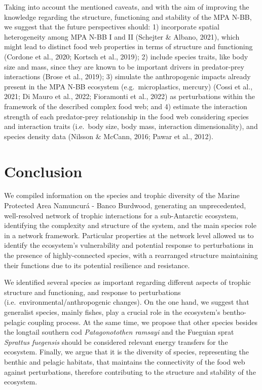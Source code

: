 \documentclass[preprint, 3p,
authoryear]{elsarticle} %
\begin{document}
Taking into account the mentioned caveats, and with the aim of improving
the knowledge regarding the structure, functioning and stability of the
MPA N-BB, we suggest that the future perspectives should: 1) incorporate
spatial heterogeneity among MPA N-BB I and II (Schejter \& Albano,
2021), which might lead to distinct food web properties in terms of
structure and functioning (Cordone et al., 2020; Kortsch et al., 2019);
2) include species traits, like body size and mass, since they are known
to be important drivers in predator-prey interactions (Brose et al.,
2019); 3) simulate the anthropogenic impacts already present in the MPA
N-BB ecosystem (e.g.~microplastics, mercury) (Cossi et al., 2021; Di
Mauro et al., 2022; Fioramonti et al., 2022) as perturbations within the
framework of the described complex food web; and 4) estimate the
interaction strength of each predator-prey relationship in the food web
considering species and interaction traits (i.e.~body size, body mass,
interaction dimensionality), and species density data (Nilsson \&
McCann, 2016; Pawar et al., 2012).

\hypertarget{conclusion}{%
\section{Conclusion}\label{conclusion}}

We compiled information on the species and trophic diversity of the
Marine Protected Area Namuncurá - Banco Burdwood, generating an
unprecedented, well-resolved network of trophic interactions for a
sub-Antarctic ecosystem, identifying the complexity and structure of the
system, and the main species role in a network framework. Particular
properties at the network level allowed us to identify the ecosystem's
vulnerability and potential response to perturbations in the presence of
highly-connected species, with a rearranged structure maintaining their
functions due to its potential resilience and resistance.

We identified several species as important regarding different aspects
of trophic structure and functioning, and response to perturbations
(i.e.~environmental/anthropogenic changes). On the one hand, we suggest
that generalist species, mainly fishes, play a crucial role in the
ecosystem's bentho-pelagic coupling process. At the same time, we
propose that other species besides the longtail southern cod
\emph{Patagonotothen ramsayi} and the Fueguian sprat \emph{Sprattus
fuegensis} should be considered relevant energy transfers for the
ecosystem. Finally, we argue that it is the diversity of species,
representing the benthic and pelagic habitats, that maintains the
connectivity of the food web against perturbations, therefore
contributing to the structure and stability of the ecosystem.
\end{document}
